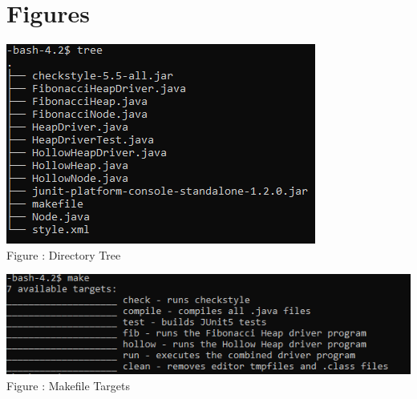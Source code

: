 \documentclass[letter,10pt]{article}
\begin{document}
\section{Figures}
\begin{center}
	\includegraphics[]{tree.png}\\
	Figure : Directory Tree
\end{center}
\medskip
\begin{center}
	\includegraphics[]{make.png}\\
	Figure :  Makefile Targets
\end{center}

\newpage
\nocite{*}
\printbibliography
\end{document}
